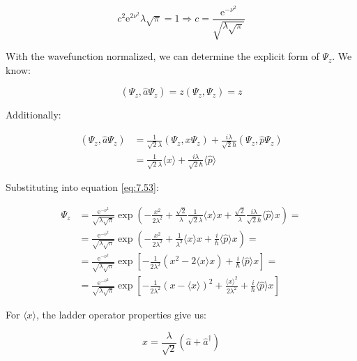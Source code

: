 \documentclass[italian]{HKNdocument}
\begin{document}
\begin{equation}
c^{2} \mathrm{e}^{2 \nu^{2}} \lambda \sqrt{\pi}=1 \Longrightarrow c=\frac{\mathrm{e}^{-\nu^{2}}}{\sqrt{\lambda \sqrt{\pi}}} \label{eq:7.58}
\end{equation}

With the wavefunction normalized, we can determine the explicit form of $\Psi_{z}$. We know:

\begin{equation}
\left(\Psi_{z}, \hat{a} \Psi_{z}\right)=z\left(\Psi_{z}, \Psi_{z}\right)=z \label{eq:7.59}
\end{equation}

Additionally:

\begin{align}
\left(\Psi_{z}, \hat{a} \Psi_{z}\right) & =\frac{1}{\sqrt{2} \lambda}\left(\Psi_{z}, x \Psi_{z}\right)+\frac{i \lambda}{\sqrt{2} \hbar}\left(\Psi_{z}, \hat{p} \Psi_{z}\right)  \label{eq:7.60}\\
& =\frac{1}{\sqrt{2} \lambda}\langle x\rangle+\frac{i \lambda}{\sqrt{2} \hbar}\langle\hat{p}\rangle
\end{align}

Substituting into equation \eqref{eq:7.53}:

\begin{align}
\Psi_{z} & =\frac{\mathrm{e}^{-\nu^{2}}}{\sqrt{\lambda \sqrt{\pi}}} \exp \left(-\frac{x^{2}}{2 \lambda^{2}}+\frac{\sqrt{2}}{\lambda} \frac{1}{\sqrt{2} \lambda}\langle x\rangle x+\frac{\sqrt{2}}{\lambda} \frac{i \lambda}{\sqrt{2} \hbar}\langle\hat{p}\rangle x\right)= \\
& =\frac{\mathrm{e}^{-\nu^{2}}}{\sqrt{\lambda \sqrt{\pi}}} \exp \left(-\frac{x^{2}}{2 \lambda^{2}}+\frac{1}{\lambda^{2}}\langle x\rangle x+\frac{i}{\hbar}\langle\hat{p}\rangle x\right)= \\
& =\frac{\mathrm{e}^{-\nu^{2}}}{\sqrt{\lambda \sqrt{\pi}}} \exp \left[-\frac{1}{2 \lambda^{2}}\left(x^{2}-2\langle x\rangle x\right)+\frac{i}{\hbar}\langle\hat{p}\rangle x\right]=  \label{eq:7.61}\\
& =\frac{\mathrm{e}^{-\nu^{2}}}{\sqrt{\lambda \sqrt{\pi}}} \exp \left[-\frac{1}{2 \lambda^{2}}(x-\langle x\rangle)^{2}+\frac{\langle x\rangle^{2}}{2 \lambda^{2}}+\frac{i}{\hbar}\langle\hat{p}\rangle x\right]
\end{align}

For $\langle x\rangle$, the ladder operator properties give us:

\begin{equation}
x=\frac{\lambda}{\sqrt{2}}\left(\hat{a}+\hat{a}^{\dagger}\right) \label{eq:7.62}
\end{equation}
\end{document}
